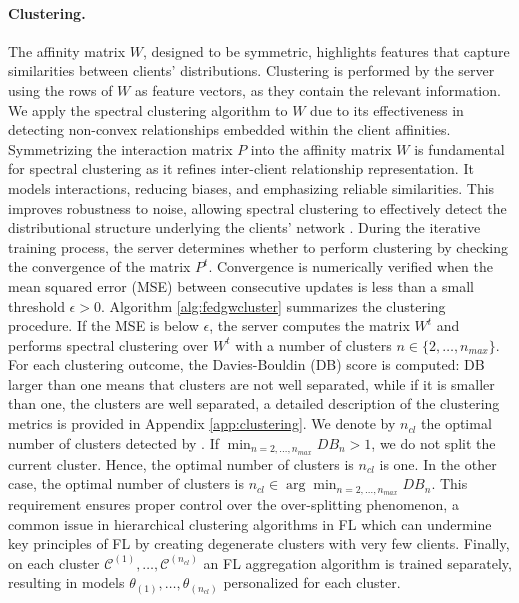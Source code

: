 \paragraph{Clustering.}
The affinity matrix $W$, designed to be symmetric, highlights features that capture similarities between clients' distributions. Clustering is performed by the server using the rows of $W$ as feature vectors, as they contain the relevant information. We apply the spectral clustering algorithm \citep{ng2001spectral} to $W$ due to its effectiveness in detecting non-convex relationships embedded within the client affinities. Symmetrizing the interaction matrix $P$ into the affinity matrix $W$ is fundamental for spectral clustering as it refines inter-client relationship representation. It models interactions, reducing biases, and emphasizing reliable similarities. This improves robustness to noise, allowing spectral clustering to effectively detect the distributional structure underlying the clients' network \citep{von2007tutorial}.
During the iterative training process, the server determines whether to perform clustering by checking the convergence of the matrix $P^t$. Convergence is numerically verified when the mean squared error (MSE) between consecutive updates is less than a small threshold $\epsilon > 0$. Algorithm \ref{alg:fedgwcluster} summarizes the clustering procedure.
If the MSE is below $\epsilon$, the server computes the matrix $W^t$ and performs spectral clustering over $W^t$ with a number of clusters $n \in \{2, \dots, n_{max}\}$. For each clustering outcome, the Davies-Bouldin (DB) score \citep{davies1979cluster} is computed: DB larger than one means that clusters are not well separated, while if it is smaller than one, the clusters are well separated, a detailed description of the clustering metrics is provided in Appendix \ref{app:clustering}. We denote by $n_{cl}$ the optimal number of clusters detected by \shortname. If $\min_{n = 2,\dots, n_{max}} DB_n > 1$, we do not split the current cluster. Hence, the optimal number of clusters is $n_{cl}$ is one. In the other case, the optimal number of clusters is  $n_{cl} \in \arg \min_{n = 2, \dots, n_{max}} DB_{n}$. This requirement ensures proper control over the over-splitting phenomenon, a common issue in hierarchical clustering algorithms in FL which can undermine key principles of FL by creating degenerate clusters with very few clients. %
Finally, on each cluster $\mathcal{C}^{(1)},\dots, \mathcal{C}^{(n_{cl})}$ an FL aggregation algorithm is trained separately, resulting in models $\theta_{(1)}, \dots, \theta_{(n_{cl})}$ personalized for each cluster.


